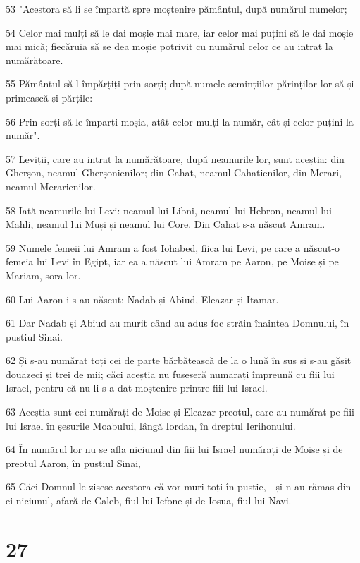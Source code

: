 \par 53 "Acestora să li se împartă spre moștenire pământul, după numărul numelor;
\par 54 Celor mai mulți să le dai moșie mai mare, iar celor mai puțini să le dai moșie mai mică; fiecăruia să se dea moșie potrivit cu numărul celor ce au intrat la numărătoare.
\par 55 Pământul să-l împărțiți prin sorți; după numele semințiilor părinților lor să-și primească și părțile:
\par 56 Prin sorți să le împarți moșia, atât celor mulți la număr, cât și celor puțini la număr".
\par 57 Leviții, care au intrat la numărătoare, după neamurile lor, sunt aceștia: din Gherșon, neamul Gherșonienilor; din Cahat, neamul Cahatienilor, din Merari, neamul Merarienilor.
\par 58 Iată neamurile lui Levi: neamul lui Libni, neamul lui Hebron, neamul lui Mahli, neamul lui Muși și neamul lui Core. Din Cahat s-a născut Amram.
\par 59 Numele femeii lui Amram a fost Iohabed, fiica lui Levi, pe care a născut-o femeia lui Levi în Egipt, iar ea a născut lui Amram pe Aaron, pe Moise și pe Mariam, sora lor.
\par 60 Lui Aaron i s-au născut: Nadab și Abiud, Eleazar și Itamar.
\par 61 Dar Nadab și Abiud au murit când au adus foc străin înaintea Domnului, în pustiul Sinai.
\par 62 Și s-au numărat toți cei de parte bărbătească de la o lună în sus și s-au găsit douăzeci și trei de mii; căci aceștia nu fuseseră numărați împreună cu fiii lui Israel, pentru că nu li s-a dat moștenire printre fiii lui Israel.
\par 63 Aceștia sunt cei numărați de Moise și Eleazar preotul, care au numărat pe fiii lui Israel în șesurile Moabului, lângă Iordan, în dreptul Ierihonului.
\par 64 În numărul lor nu se afla niciunul din fiii lui Israel numărați de Moise și de preotul Aaron, în pustiul Sinai,
\par 65 Căci Domnul le zisese acestora că vor muri toți în pustie, - și n-au rămas din ei niciunul, afară de Caleb, fiul lui Iefone și de Iosua, fiul lui Navi.

\chapter{27}

